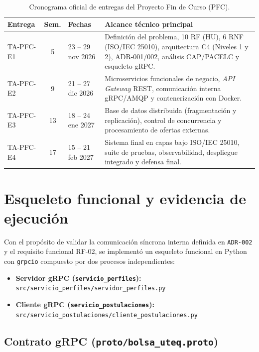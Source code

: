 \documentclass[11pt,a4paper]{article}
\begin{document}
\begin{table}[htbp]
\centering
\caption{Cronograma oficial de entregas del Proyecto Fin de Curso (PFC).}
\label{tab:cronograma}
\begin{tabularx}{\textwidth}{l c l X}
\toprule
\textbf{Entrega} & \textbf{Sem.} & \textbf{Fechas} & \textbf{Alcance técnico principal} \\
\midrule
TA-PFC-E1 & 5 & 23 -- 29 nov 2026 & Definición del problema, 10 RF (HU), 6 RNF (ISO/IEC 25010), arquitectura C4 (Niveles 1 y 2), ADR-001/002, análisis CAP/PACELC y esqueleto gRPC. \\
TA-PFC-E2 & 9 & 21 -- 27 dic 2026 & Microservicios funcionales de negocio, \textit{API Gateway} REST, comunicación interna gRPC/AMQP y contenerización con Docker. \\
TA-PFC-E3 & 13 & 18 -- 24 ene 2027 & Base de datos distribuida (fragmentación y replicación), control de concurrencia y procesamiento de ofertas externas. \\
TA-PFC-E4 & 17 & 15 -- 21 feb 2027 & Sistema final en capas bajo ISO/IEC 25010, suite de pruebas, observabilidad, despliegue integrado y defensa final. \\
\bottomrule
\end{tabularx}
\end{table}

\section{Esqueleto funcional y evidencia de ejecución}

Con el propósito de validar la comunicación síncrona interna definida en \texttt{ADR-002} y el requisito funcional RF-02, se implementó un esqueleto funcional en Python con \texttt{grpcio} compuesto por dos procesos independientes:
\begin{itemize}
    \item \textbf{Servidor gRPC (\texttt{servicio\_perfiles}):}\\ \texttt{src/servicio\_perfiles/servidor\_perfiles.py}
    \item \textbf{Cliente gRPC (\texttt{servicio\_postulaciones}):}\\ \texttt{src/servicio\_postulaciones/cliente\_postulaciones.py}
\end{itemize}

\subsection{Contrato gRPC (\texttt{proto/bolsa\_uteq.proto})}
\end{document}
